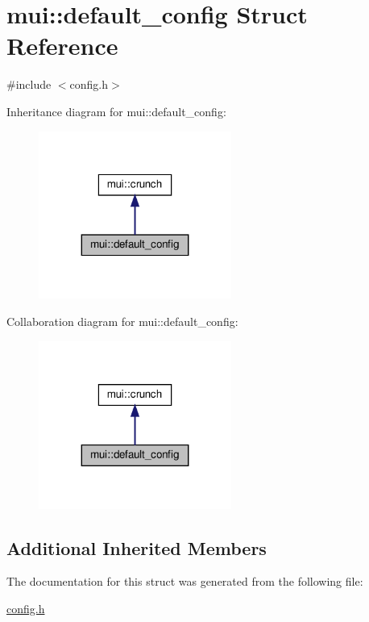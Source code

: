\hypertarget{structmui_1_1default__config}{}\section{mui\+:\+:default\+\_\+config Struct Reference}
\label{structmui_1_1default__config}


{\ttfamily \#include $<$config.\+h$>$}



Inheritance diagram for mui\+:\+:default\+\_\+config\+:
\nopagebreak
\begin{figure}[H]
\begin{center}
\leavevmode
\includegraphics[width=179pt]{structmui_1_1default__config__inherit__graph}
\end{center}
\end{figure}


Collaboration diagram for mui\+:\+:default\+\_\+config\+:
\nopagebreak
\begin{figure}[H]
\begin{center}
\leavevmode
\includegraphics[width=179pt]{structmui_1_1default__config__coll__graph}
\end{center}
\end{figure}
\subsection*{Additional Inherited Members}


The documentation for this struct was generated from the following file\+:\begin{DoxyCompactItemize}
\item 
\hyperlink{config_8h}{config.\+h}\end{DoxyCompactItemize}

